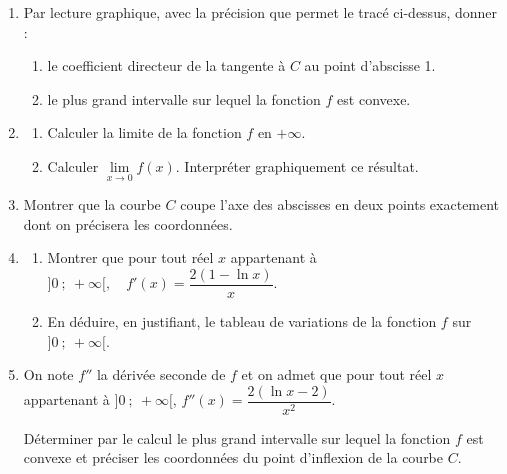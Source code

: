 \begin{enumerate}
	\item Par lecture graphique, avec la précision que permet le tracé ci-dessus, donner :

	\begin{enumerate}
		\item le coefficient directeur de la tangente à $C$ au point d'abscisse 1.

		\item 	le plus grand intervalle sur lequel la fonction $f$ est convexe.
	\end{enumerate}

	\item \begin{enumerate}
		\item Calculer la limite de la fonction $f$ en $+\infty$.

		\item Calculer $\lim\limits_{x \to 0} f(x)$. Interpréter graphiquement ce résultat.
	\end{enumerate}

	\item Montrer que la courbe $C$ coupe l'axe des abscisses en deux points exactement dont on précisera les coordonnées.

	\item \begin{enumerate}
		\item Montrer que pour tout réel $x$ appartenant à $]0~;~+\infty[, \quad f'(x) = \dfrac{2(1-\ln x)}{x}$.

		\item En déduire, en justifiant, le tableau de variations de la fonction $f$ sur $]0~;~+\infty[$.
	\end{enumerate}

	\item On note $f''$ la dérivée seconde de $f$ et on admet que pour tout réel $x$ appartenant à $]0~;~+\infty[$, $f''(x) = \dfrac{2(\ln x-2)}{x^{2}}$.

Déterminer par le calcul le plus grand intervalle sur lequel la fonction $f$ est convexe et préciser les coordonnées du point d'inflexion de la courbe $C$.
\end{enumerate}

\vspace{1cm}
